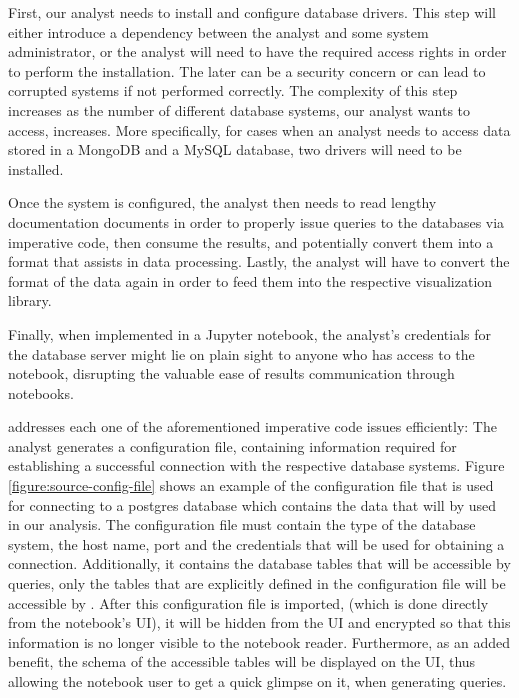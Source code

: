 First, our analyst needs to install and configure database drivers. This step will either introduce a dependency between the analyst and some system administrator, or the analyst will need to have the required access rights in order to perform the installation. The later can be a security concern or can lead to corrupted systems if not performed correctly. The complexity of this step increases as the number of different database systems, our analyst wants to access, increases. More specifically, for cases when an analyst needs to access data stored in a MongoDB and a MySQL database, two drivers will need to be installed.

Once the system is configured, the analyst then needs to read lengthy documentation documents in order to properly issue queries to the databases via imperative code, then consume the results, and potentially convert them into a format that assists in data processing. Lastly, the analyst will have to convert the format of the data again in order to feed them into the respective visualization library.

Finally, when implemented in a Jupyter notebook, the analyst's credentials for the database server might lie on plain sight to anyone who has access to the notebook, disrupting the valuable ease of results communication through notebooks.

{\projname} addresses each one of the aforementioned imperative code issues efficiently: The analyst generates a configuration file, containing information required for establishing a successful connection with the respective database systems. Figure \ref{figure:source-config-file} shows an example of the configuration file that is used for connecting to a postgres database which contains the data that will by used in our analysis. The configuration file must contain the type of the database system, the host name, port and the credentials that will be used for obtaining a connection. Additionally, it contains the database tables that will be accessible by queries, only the tables that are explicitly defined in the configuration file will be accessible by \projname. After this configuration file is imported, (which is done directly from the notebook's UI), it will be hidden from the UI and encrypted so that this information is no longer visible to the notebook reader.  Furthermore, as an added benefit, the schema of the accessible tables will be displayed on the UI, thus allowing the notebook user to get a quick glimpse on it, when generating queries. 


